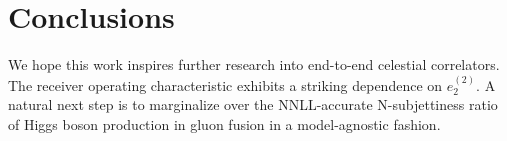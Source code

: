 \section{Conclusions}\label{sec:conclusions}

We hope this work inspires further research into end-to-end celestial
correlators. The receiver operating characteristic exhibits a striking
dependence on $e_2^{(2)}$. A natural next step is to marginalize over
the NNLL-accurate N-subjettiness ratio of Higgs boson production in
gluon fusion in a model-agnostic fashion.

